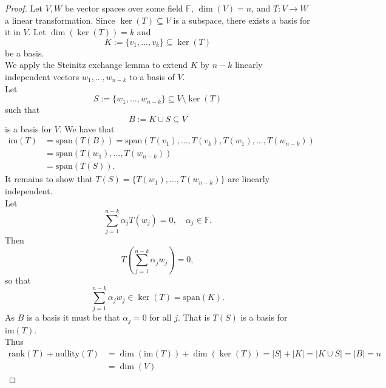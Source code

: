 \documentclass[12pt]{article}
\newcommand{\field}{\mathbb{F}}
\newcommand{\card}[1]{|#1|}
\newcommand\set[1]{\{#1\}}
\newcommand{\im}[0]{\text{im}}
\begin{document}
\begin{proof}
  Let $V, W$ be vector spaces over some field $\field$, $\dim(V)=n$, and $T :V \to W$ a linear transformation.
  Since $\ker(T) \subseteq V$ is a subspace, there exists a basis for it in $V$. Let $\dim(\ker(T)) = k$ and
  \begin{equation*}
    K := \set{v_1, \dots, v_k} \subseteq \ker(T)
  \end{equation*}
  be a basis. \\
  We apply the Steinitz exchange lemma to extend $K$ by $n-k$ linearly independent vectors
  $w_1, \dots, w_{n-k}$ to a basis of $V$. \\
  Let
  \begin{equation*}
    S := \set{w_1, \dots, w_{n-k}} \subseteq V \setminus \ker(T)
  \end{equation*}
  such that
  \begin{equation*}
    B := K \cup S \subseteq V
  \end{equation*}
  is a basis for $V$. We have that
  \begin{align*}
    \im(T) &= \text{span}(T(B)) = \text{span}(T(v_1), \dots, T(v_k), T(w_1), \dots, T(w_{n-k})) \\
    &= \text{span}(T(w_1), \dots, T(w_{n-k})) \\
    &= \text{span}(T(S)).
  \end{align*}
  It remains to show that $T(S) = \set{T(w_1), \dots, T(w_{n-k})}$ are linearly independent. \\
  Let
  \begin{equation*}
    \sum\limits_{j=1}^{n-k}\alpha_j T(w_j) = 0, \quad \alpha_j \in \field.
  \end{equation*}
  Then
  \begin{equation*}
   T(\sum\limits_{j=1}^{n-k}\alpha_j w_j) = 0,
  \end{equation*}
  so that
  \begin{equation*}
    \sum\limits_{j=1}^{n-k}\alpha_j w_j \in \ker(T) = \text{span}(K).
  \end{equation*}
  As $B$ is a basis it must be that $\alpha_j = 0$ for all $j$. That is $T(S)$ is a basis for $\im(T)$.\\
  Thus
  \begin{align*}
    \text{rank}(T) + \text{nullity}(T)
    &= \dim(\im(T)) + \dim(\ker(T)) = \card{S} + \card{K} = \card {K \cup S} = \card{B} = n \\
    &= \dim(V)
  \end{align*}
  
\end{proof}
\end{document}
